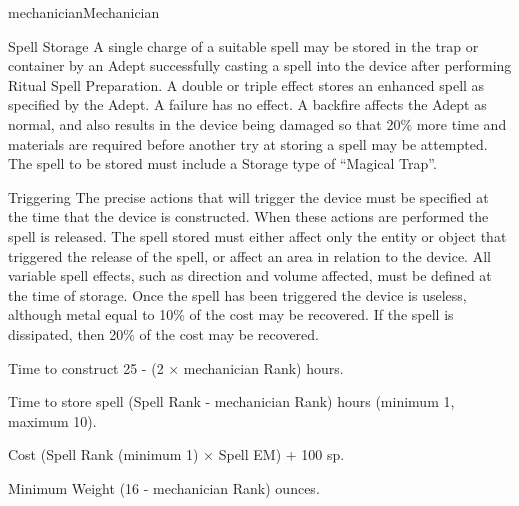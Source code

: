 \begin{Skill}[2.2]{mechanician}{Mechanician}
\begin{Description}
\item[Spell] Storage A single charge of a suitable spell may be stored
  in the trap or container by an Adept successfully casting a spell
  into the device after performing Ritual Spell Preparation.  A double
  or triple effect stores an enhanced spell as specified by the Adept.
  A failure has no effect.  A backfire affects the Adept as normal,
  and also results in the device being damaged so that 20\% more time
  and materials are required before another try at storing a spell may
  be attempted.  The spell to be stored must include a Storage type of
  “Magical Trap”.

\item[Triggering] The precise actions that will trigger the device
  must be specified at the time that the device is constructed.  When
  these actions are performed the spell is released.  The spell stored
  must either affect only the entity or object that triggered the
  release of the spell, or affect an area in relation to the
  device. All variable spell effects, such as direction and volume
  affected, must be defined at the time of storage.  Once the spell
  has been triggered the device is useless, although metal equal to
  10\% of the cost may be recovered.  If the spell is dissipated,
  then 20\% of the cost may be recovered.

\item[Time to construct] 25 - (2 × mechanician Rank) hours.

\item[Time to store spell] (Spell Rank - mechanician Rank) hours
  (minimum 1, maximum 10).

\item[Cost] (Spell Rank (minimum 1) × Spell EM) + 100 sp.

\item[Minimum Weight] (16 - mechanician Rank) ounces.

\end{Description}
  
\end{Skill}
